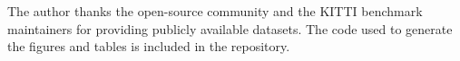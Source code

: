 The author thanks the open-source community and the KITTI benchmark maintainers for providing publicly available datasets. The code used to generate the figures and tables is included in the repository.
